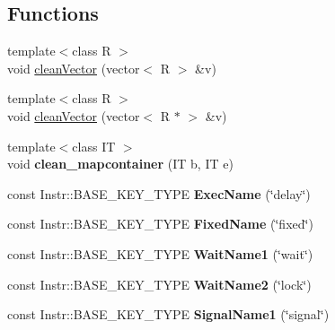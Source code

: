 \subsection*{Functions}
\begin{DoxyCompactItemize}
\item 
{\footnotesize template$<$class R $>$ }\\void \hyperlink{namespaceRTSim_a2d2b4e5e3cff908def62cd041bba0097}{clean\+Vector} (vector$<$ R $>$ \&v)
\item 
{\footnotesize template$<$class R $>$ }\\void \hyperlink{namespaceRTSim_ae3686d1c602ba03b7863a711767eaac3}{clean\+Vector} (vector$<$ R $\ast$ $>$ \&v)
\item 
{\footnotesize template$<$class IT $>$ }\\void {\bfseries clean\+\_\+mapcontainer} (IT b, IT e)\hypertarget{namespaceRTSim_a37cc0d710401567d800e20f7e11301e9}{}\label{namespaceRTSim_a37cc0d710401567d800e20f7e11301e9}

\item 
const Instr\+::\+B\+A\+S\+E\+\_\+\+K\+E\+Y\+\_\+\+T\+Y\+PE {\bfseries Exec\+Name} (\char`\"{}delay\char`\"{})\hypertarget{namespaceRTSim_a784b584c83fc58e74c6c15377d5d56f8}{}\label{namespaceRTSim_a784b584c83fc58e74c6c15377d5d56f8}

\item 
const Instr\+::\+B\+A\+S\+E\+\_\+\+K\+E\+Y\+\_\+\+T\+Y\+PE {\bfseries Fixed\+Name} (\char`\"{}fixed\char`\"{})\hypertarget{namespaceRTSim_aa89766461160fa03a48c7099d8348f16}{}\label{namespaceRTSim_aa89766461160fa03a48c7099d8348f16}

\item 
const Instr\+::\+B\+A\+S\+E\+\_\+\+K\+E\+Y\+\_\+\+T\+Y\+PE {\bfseries Wait\+Name1} (\char`\"{}wait\char`\"{})\hypertarget{namespaceRTSim_a29f4e05c358eeafa81fd37bdd7339e8b}{}\label{namespaceRTSim_a29f4e05c358eeafa81fd37bdd7339e8b}

\item 
const Instr\+::\+B\+A\+S\+E\+\_\+\+K\+E\+Y\+\_\+\+T\+Y\+PE {\bfseries Wait\+Name2} (\char`\"{}lock\char`\"{})\hypertarget{namespaceRTSim_a2082536c93f8a00993434cb76e63d0da}{}\label{namespaceRTSim_a2082536c93f8a00993434cb76e63d0da}

\item 
const Instr\+::\+B\+A\+S\+E\+\_\+\+K\+E\+Y\+\_\+\+T\+Y\+PE {\bfseries Signal\+Name1} (\char`\"{}signal\char`\"{})\hypertarget{namespaceRTSim_a316c0a21c3d831d6df8e6df525c58026}{}\label{namespaceRTSim_a316c0a21c3d831d6df8e6df525c58026}


\end{DoxyCompactItemize}
